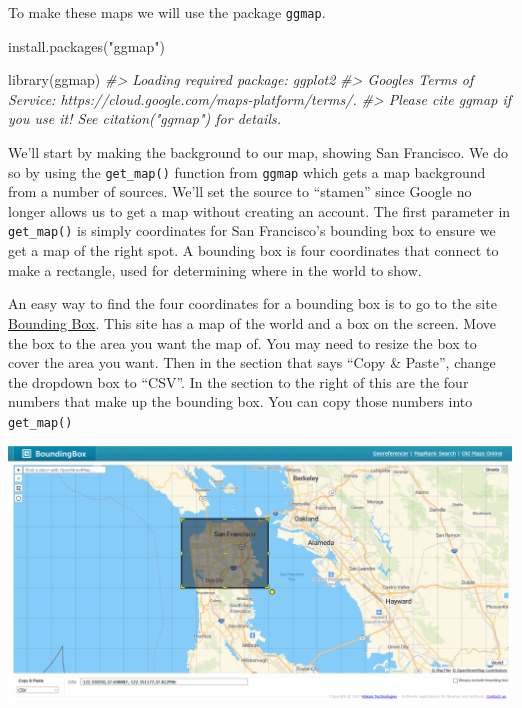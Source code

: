 \documentclass[
  12pt,
]{book}
\newenvironment{Shaded}{\begin{snugshade}}{\end{snugshade}}
\newcommand{\CommentTok}[1]{\textcolor[rgb]{0.37,0.37,0.37}{\textit{#1}}}
\newcommand{\FunctionTok}[1]{\textcolor[rgb]{0,0,0}{#1}}
\newcommand{\NormalTok}[1]{#1}
\newcommand{\StringTok}[1]{\textcolor[rgb]{0.5,0.5,0.5}{#1}}
\begin{document}
To make these maps we will use the package \texttt{ggmap}.

\begin{Shaded}
\begin{Highlighting}[]
\FunctionTok{install.packages}\NormalTok{(}\StringTok{"ggmap"}\NormalTok{)}
\end{Highlighting}
\end{Shaded}

\begin{Shaded}
\begin{Highlighting}[]
\FunctionTok{library}\NormalTok{(ggmap)}
\CommentTok{\#\textgreater{} Loading required package: ggplot2}
\CommentTok{\#\textgreater{} Google\textquotesingle{}s Terms of Service: https://cloud.google.com/maps{-}platform/terms/.}
\CommentTok{\#\textgreater{} Please cite ggmap if you use it! See citation("ggmap") for details.}
\end{Highlighting}
\end{Shaded}

We'll start by making the background to our map, showing San Francisco. We do so by using the \texttt{get\_map()} function from \texttt{ggmap} which gets a map background from a number of sources. We'll set the source to ``stamen'' since Google no longer allows us to get a map without creating an account. The first parameter in \texttt{get\_map()} is simply coordinates for San Francisco's bounding box to ensure we get a map of the right spot. A bounding box is four coordinates that connect to make a rectangle, used for determining where in the world to show.

An easy way to find the four coordinates for a bounding box is to go to the site \href{https://boundingbox.klokantech.com/}{Bounding Box}. This site has a map of the world and a box on the screen. Move the box to the area you want the map of. You may need to resize the box to cover the area you want. Then in the section that says ``Copy \& Paste'', change the dropdown box to ``CSV''. In the section to the right of this are the four numbers that make up the bounding box. You can copy those numbers into \texttt{get\_map()}

\includegraphics{images/bounding_box.PNG}
\end{document}

